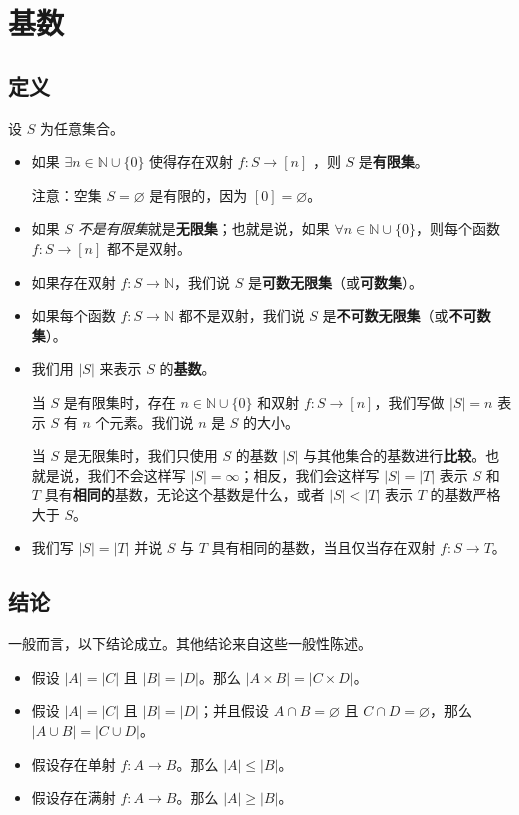 \section{基数}

\subsection{定义}

设 $S$ 为任意集合。

\begin{itemize}
    \item 如果 $\exists n \in \mathbb{N} \cup \{0\}$ 使得存在双射 $f : S \to [n]$ ，则 $S$ 是\textbf{有限集}。

          注意：空集 $S = \varnothing$ 是有限的，因为 $[0] = \varnothing$。
    \item 如果 $S$ \emph{不是有限集}就是\textbf{无限集}；也就是说，如果 $\forall n \in \mathbb{N} \cup \{0\}$，则每个函数 $f : S \to [n]$ 都不是双射。
    \item 如果存在双射 $f : S \to \mathbb{N}$，我们说 $S$ 是\textbf{可数无限集}（或\textbf{可数集}）。
    \item 如果每个函数 $f : S \to \mathbb{N}$ 都不是双射，我们说 $S$ 是\textbf{不可数无限集}（或\textbf{不可数集}）。
    \item 我们用 $|S|$ 来表示 $S$ 的\textbf{基数}。

          当 $S$ 是有限集时，存在 $n \in \mathbb{N} \cup \{0\}$ 和双射 $f : S \to [n]$，我们写做 $|S| = n$ 表示 $S$ 有 $n$ 个元素。我们说 $n$ 是 $S$ 的大小。

          当 $S$ 是无限集时，我们只使用 $S$ 的基数 $|S|$ 与其他集合的基数进行\textbf{比较}。也就是说，我们不会这样写 $|S| = \infty$；相反，我们会这样写 $|S| = |T|$ 表示 $S$ 和 $T$ 具有\textbf{相同的}基数，无论这个基数是什么，或者 $|S| < |T|$ 表示 $T$ 的基数严格大于 $S$。
    \item  我们写 $|S| = |T|$ 并说 $S$ 与 $T$ 具有相同的基数，当且仅当存在双射 $f : S \to T$。
\end{itemize}

\subsection{结论}

一般而言，以下结论成立。其他结论来自这些一般性陈述。

\begin{itemize}
    \item 假设 $|A|= |C|$ 且 $|B|= |D|$。那么 $|A \times B|= |C \times D|$。
    \item 假设 $|A|= |C|$ 且 $|B|= |D|$；并且假设 $A \cap B = \varnothing$ 且 $C \cap D = \varnothing$，那么 $|A \cup B | = |C \cup D|$。
    \item 假设存在单射 $f : A \to B$。那么 $|A| \le |B|$。
    \item 假设存在满射 $f : A \to B$。那么 $|A| \ge |B|$。
\end{itemize}

